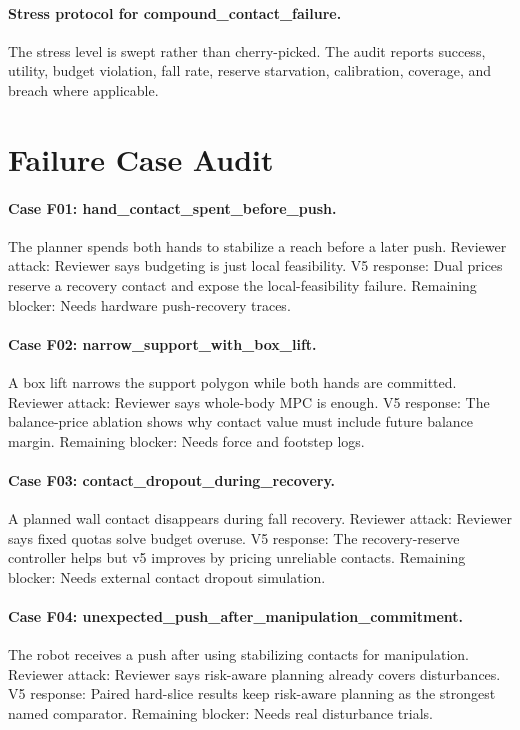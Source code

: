 \documentclass{article}
\begin{document}
\paragraph{Stress protocol for compound\_contact\_failure.} The stress level is swept rather than cherry-picked. The audit reports success, utility, budget violation, fall rate, reserve starvation, calibration, coverage, and breach where applicable.
\clearpage
\section{Failure Case Audit}
\paragraph{Case F01: hand\_contact\_spent\_before\_push.} The planner spends both hands to stabilize a reach before a later push. Reviewer attack: Reviewer says budgeting is just local feasibility. V5 response: Dual prices reserve a recovery contact and expose the local-feasibility failure. Remaining blocker: Needs hardware push-recovery traces.
\paragraph{Case F02: narrow\_support\_with\_box\_lift.} A box lift narrows the support polygon while both hands are committed. Reviewer attack: Reviewer says whole-body MPC is enough. V5 response: The balance-price ablation shows why contact value must include future balance margin. Remaining blocker: Needs force and footstep logs.
\paragraph{Case F03: contact\_dropout\_during\_recovery.} A planned wall contact disappears during fall recovery. Reviewer attack: Reviewer says fixed quotas solve budget overuse. V5 response: The recovery-reserve controller helps but v5 improves by pricing unreliable contacts. Remaining blocker: Needs external contact dropout simulation.
\paragraph{Case F04: unexpected\_push\_after\_manipulation\_commitment.} The robot receives a push after using stabilizing contacts for manipulation. Reviewer attack: Reviewer says risk-aware planning already covers disturbances. V5 response: Paired hard-slice results keep risk-aware planning as the strongest named comparator. Remaining blocker: Needs real disturbance trials.
\end{document}
